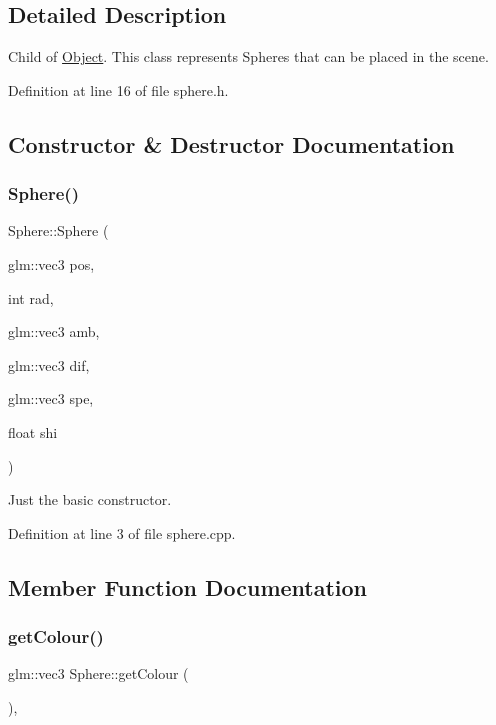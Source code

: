 \subsection{Detailed Description}
Child of \mbox{\hyperlink{class_object}{Object}}. This class represents Spheres that can be placed in the scene. 

Definition at line 16 of file sphere.\+h.



\subsection{Constructor \& Destructor Documentation}
\mbox{\label{class_sphere_ac5331c3b7a05c78676a39ea7d30791ca}} 
\subsubsection{\texorpdfstring{Sphere()}{Sphere()}}
{\footnotesize\ttfamily Sphere\+::\+Sphere (\begin{DoxyParamCaption}\item[{glm\+::vec3}]{pos,  }\item[{int}]{rad,  }\item[{glm\+::vec3}]{amb,  }\item[{glm\+::vec3}]{dif,  }\item[{glm\+::vec3}]{spe,  }\item[{float}]{shi }\end{DoxyParamCaption})}



Just the basic constructor. 



Definition at line 3 of file sphere.\+cpp.



\subsection{Member Function Documentation}
\mbox{\label{class_sphere_abc6455e04b563fb57b91f12183fa4d18}} 
\subsubsection{\texorpdfstring{get\+Colour()}{getColour()}\hspace{0.1cm}{\footnotesize\ttfamily [1/2]}}
{\footnotesize\ttfamily glm\+::vec3 Sphere\+::get\+Colour (\begin{DoxyParamCaption}{ }\end{DoxyParamCaption})\hspace{0.3cm}{\ttfamily [override]}, {\ttfamily [virtual]}}



